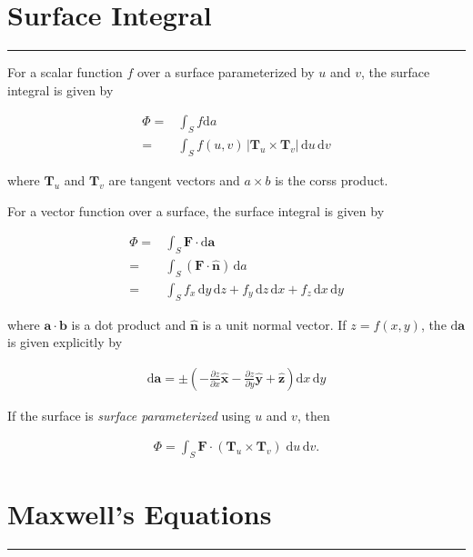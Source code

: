 \documentclass[letterpaper,10pt,titlepage]{article}
\begin{document}
\section*{Surface Integral}
\hrule
\addtocounter{section}{1}

For a scalar function $f$ over a surface parameterized by $u$ and $v$, the surface integral is given by

\begin{align}
  \Phi =& \int_S f \mathrm{d}a\,\\
       =& \int_S f(u,v)\, |\mathbf{T}_u \times \mathbf{T}_v|\,
          \mathrm{d}u\, \mathrm{d}v
\end{align}

where $\mathbf{T}_u$ and $\mathbf{T}_v$ are tangent vectors and $a \times b$
is the corss product.

For a vector function over a surface, the surface integral is given by

\begin{align}
  \Phi =& \int_S \mathbf{F} \cdot \mathrm{d}\mathbf{a}\,\\
       =& \int_S (\mathbf{F \cdot \hat{n}})\, \mathrm{d}a\,\\
       =& \int_S f_x\, \mathrm{d}y\, \mathrm{d}z + f_y\, \mathrm{d}z\,
          \mathrm{d}x + f_z\, \mathrm{d}x\, \mathrm{d}y
\end{align}

where $\mathbf{a \cdot b}$ is a dot product and $\mathbf{\hat{n}}$ is a unit normal
vector. If $z = f (x, y)$, the $\mathrm{d}\mathbf{a}$ is given explicitly by

\begin{align}
  \mathrm{d}\mathbf{a} = \pm \left( -
                                \frac{\partial z}{\partial x} \mathbf{\hat{x}} -
                                \frac{\partial z}{\partial y} \mathbf{\hat{y}} +
                                \mathbf{\hat{z}}
                             \right)
                         \mathrm{d}x\, \mathrm{d}y
\end{align}

If the surface is \emph{surface parameterized} using $u$ and $v$, then

\begin{align}
  \Phi = \int_S \mathbf{F} \cdot (\mathbf{T}_u \times \mathbf{T}_v)\;
         \mathrm{d}u\, \mathrm{d}v.
\end{align}

\newpage

\section*{Maxwell's Equations}
\hrule
\end{document}
